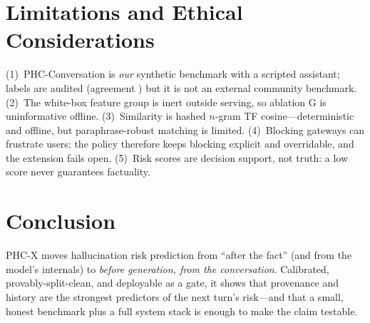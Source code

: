 \documentclass[10pt]{article}
\begin{document}
\section{Limitations and Ethical Considerations}
(1)~PHC-Conversation is \emph{our} synthetic benchmark with a scripted
assistant; labels are audited (agreement \agreement{}) but it is not an
external community benchmark. (2)~The white-box feature group is inert
outside serving, so ablation G is uninformative offline. (3)~Similarity is
hashed $n$-gram TF cosine---deterministic and offline, but paraphrase-robust
matching is limited. (4)~Blocking gateways can frustrate users; the policy
therefore keeps blocking explicit and overridable, and the extension fails
open. (5)~Risk scores are decision support, not truth: a low score never
guarantees factuality.

\section{Conclusion}
PHC-X moves hallucination risk prediction from ``after the fact'' (and from
the model's internals) to \emph{before generation, from the conversation}.
Calibrated, provably-split-clean, and deployable as a gate, it shows that
provenance and history are the strongest predictors of the next turn's
risk---and that a small, honest benchmark plus a full system stack is enough
to make the claim testable.
\end{document}
